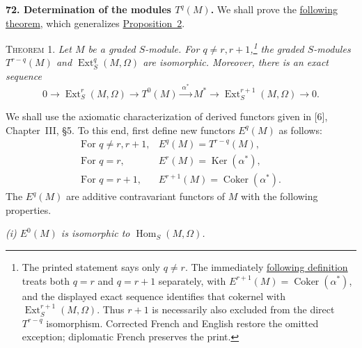 
\label{fac:III:4:no:72}
\textbf{72. Determination of the modules $T^q(M)$.}
We shall prove the \hyperref[fac:III:4:no:72:thm:1]{following theorem}, which generalizes
\hyperref[fac:III:4:no:71:prop:2]{Proposition~2}.

\label{fac:III:4:no:72:thm:1}
\textsc{Theorem 1.} \textit{Let $M$ be a graded $S$-module. For
$q\neq r,r+1$,\footnote{The printed statement says only $q\neq r$.
 The immediately \hyperref[fac:III:4:no:72:def:Eq]{following definition} treats both $q=r$ and $q=r+1$
separately, with $E^{r+1}(M)=\operatorname{Coker}(\alpha^*)$, and the
displayed exact sequence identifies that cokernel with
$\operatorname{Ext}_S^{r+1}(M,\Omega)$. Thus $r+1$ is necessarily also
excluded from the direct $T^{r-q}$ isomorphism. Corrected French and
English restore the omitted exception; diplomatic French preserves the
print.} the graded $S$-modules $T^{r-q}(M)$ and
$\operatorname{Ext}_S^q(M,\Omega)$ are isomorphic. Moreover, there is
an exact sequence}
\label{fac:III:4:no:72:formula:theorem-exact}
\[
0\longrightarrow\operatorname{Ext}_S^r(M,\Omega)
\longrightarrow T^0(M)\xrightarrow{\ \alpha^*\ }M^*
\longrightarrow\operatorname{Ext}_S^{r+1}(M,\Omega)
\longrightarrow0.
\]

We shall use the axiomatic characterization of derived functors given
in [6], Chapter~III, \S5. To this end, first define new functors
$E^q(M)$ as follows:
\label{fac:III:4:no:72:def:Eq}
\[
\begin{array}{ll}
\text{For }q\neq r,r+1, & E^q(M)=T^{r-q}(M),\\[4pt]
\text{For }q=r, & E^r(M)=\operatorname{Ker}(\alpha^*),\\[4pt]
\text{For }q=r+1, & E^{r+1}(M)=\operatorname{Coker}(\alpha^*).
\end{array}
\]
\label{fac:III:4:no:72:properties}
The $E^q(M)$ are additive contravariant functors of $M$ with the
following properties.

\label{fac:III:4:no:72:property:i}
\textit{(i) $E^0(M)$ is isomorphic to
$\operatorname{Hom}_S(M,\Omega)$.}

